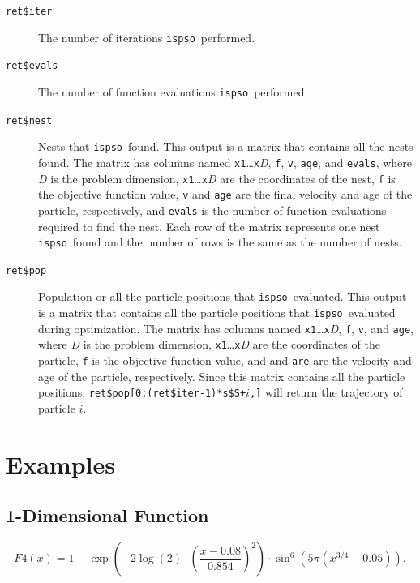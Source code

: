 \documentclass{article}
\def\ispso{\texttt{ispso}}
\begin{document}
\begin{description}
  \item[\texttt{ret\$iter}]
    The number of iterations \ispso\ performed.
  \item[\texttt{ret\$evals}]
    The number of function evaluations \ispso\ performed.
  \item[\texttt{ret\$nest}]
    Nests that \ispso\ found.
    This output is a matrix that contains all the nests found.
    The matrix has columns named \texttt{x1}\dots\texttt{x}\textit{D}, \texttt{f}, \texttt{v}, \texttt{age}, and \texttt{evals}, where \textit{D} is the problem dimension, \texttt{x1}\dots\texttt{x}\textit{D} are the coordinates of the nest, \texttt{f} is the objective function value, \texttt{v} and \texttt{age} are the final velocity and age of the particle, respectively, and \texttt{evals} is the number of function evaluations required to find the nest.
    Each row of the matrix represents one nest \ispso\ found and the number of rows is the same as the number of nests.
  \item[\texttt{ret\$pop}]
    Population or all the particle positions that \ispso\ evaluated.
    This output is a matrix that contains all the particle positions that \ispso\ evaluated during optimization.
    The matrix has columns named \texttt{x1}\dots\texttt{x}\textit{D}, \texttt{f}, \texttt{v}, and \texttt{age}, where \textit{D} is the problem dimension, \texttt{x1}\dots\texttt{x}\textit{D} are the coordinates of the particle, \texttt{f} is the objective function value, and  and \texttt{are} are the velocity and age of the particle, respectively.
    Since this matrix contains all the particle positions, \texttt{ret\$pop[0:(ret\$iter-1)*s\$S+$i$,]} will return the trajectory of particle $i$.
\end{description}

\section{Examples}

\subsection{1-Dimensional Function}

\begin{equation*}
  F4(x)=1-\exp\left(-2\log(2)\cdot\left(\frac{x-0.08}{0.854}\right)^2\right)
    \cdot\sin^6\left(5\pi(x^{3/4}-0.05)\right).
\end{equation*}
\end{document}
